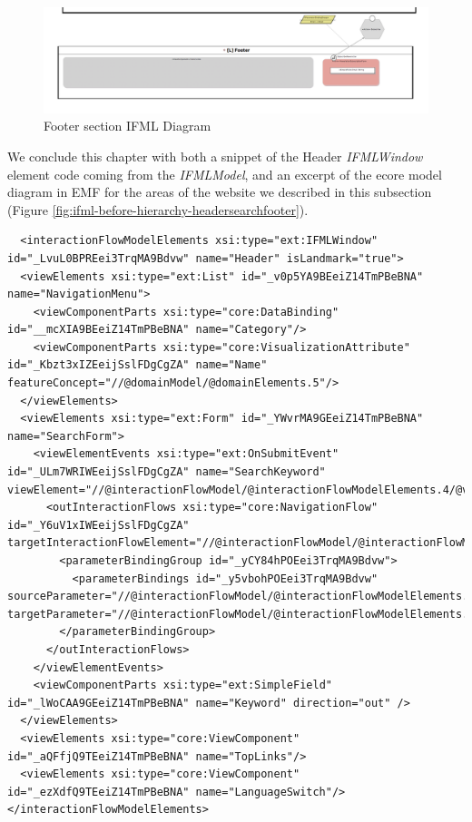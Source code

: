 \vspace{0.5cm}
\begin{figure}[H]
  \centering
    \includegraphics[width=12cm]{images/diagrams/before/ifml-footer.png}
  \caption{Footer section IFML Diagram}
  \label{fig:ifml-before-footer}
\end{figure}
\vspace{0.5cm}

\newpage
We conclude this chapter with both a snippet of the Header \textit{IFMLWindow} element code coming from the \textit{IFMLModel}, and an excerpt of the ecore model diagram in EMF for the areas of the website we described in this subsection (Figure \ref{fig:ifml-before-hierarchy-headersearchfooter}).

\vspace{0.5cm}
\lstset{language=XML}
\begin{lstlisting} 
  <interactionFlowModelElements xsi:type="ext:IFMLWindow" id="_LvuL0BPREei3TrqMA9Bdvw" name="Header" isLandmark="true">
  <viewElements xsi:type="ext:List" id="_v0p5YA9BEeiZ14TmPBeBNA" name="NavigationMenu">
    <viewComponentParts xsi:type="core:DataBinding" id="__mcXIA9BEeiZ14TmPBeBNA" name="Category"/>
    <viewComponentParts xsi:type="core:VisualizationAttribute" id="_Kbzt3xIZEeijSslFDgCgZA" name="Name" featureConcept="//@domainModel/@domainElements.5"/>
  </viewElements>
  <viewElements xsi:type="ext:Form" id="_YWvrMA9GEeiZ14TmPBeBNA" name="SearchForm">
    <viewElementEvents xsi:type="ext:OnSubmitEvent" id="_ULm7WRIWEeijSslFDgCgZA" name="SearchKeyword" viewElement="//@interactionFlowModel/@interactionFlowModelElements.4/@viewElements.1">
      <outInteractionFlows xsi:type="core:NavigationFlow" id="_Y6uV1xIWEeijSslFDgCgZA" targetInteractionFlowElement="//@interactionFlowModel/@interactionFlowModelElements.3">
        <parameterBindingGroup id="_yCY84hPOEei3TrqMA9Bdvw">
          <parameterBindings id="_y5vbohPOEei3TrqMA9Bdvw" sourceParameter="//@interactionFlowModel/@interactionFlowModelElements.4/@viewElements.1/@viewComponentParts.0" targetParameter="//@interactionFlowModel/@interactionFlowModelElements.3/@parameters.0"/>
        </parameterBindingGroup>
      </outInteractionFlows>
    </viewElementEvents>
    <viewComponentParts xsi:type="ext:SimpleField" id="_lWoCAA9GEeiZ14TmPBeBNA" name="Keyword" direction="out" />
  </viewElements>
  <viewElements xsi:type="core:ViewComponent" id="_aQFfjQ9TEeiZ14TmPBeBNA" name="TopLinks"/>
  <viewElements xsi:type="core:ViewComponent" id="_ezXdfQ9TEeiZ14TmPBeBNA" name="LanguageSwitch"/>
</interactionFlowModelElements>
\end{lstlisting}
\vspace{0.5cm}


